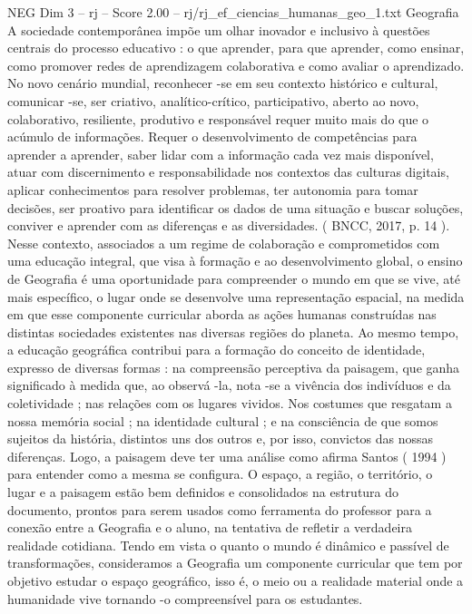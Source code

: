 \begin{textsample}{NEG Dim 3 – rj – Score 2.00 – rj/rj\_ef\_ciencias\_humanas\_geo\_1.txt}  \label{ex:f3_neg_278}
Geografia A sociedade contemporânea impõe um olhar inovador e inclusivo à questões centrais do processo educativo : o que aprender, para que aprender, como ensinar, como promover redes de aprendizagem colaborativa e como avaliar o aprendizado.
No novo cenário mundial, reconhecer -se em seu contexto histórico e cultural, comunicar -se, ser criativo, analítico-crítico, participativo, aberto ao novo, colaborativo, resiliente, produtivo e responsável requer muito mais do que o acúmulo de informações.
Requer o desenvolvimento de competências para aprender a aprender, saber lidar com a informação cada vez mais disponível, atuar com discernimento e responsabilidade nos contextos das culturas digitais, aplicar conhecimentos para resolver problemas, ter autonomia para tomar decisões, ser proativo para identificar os dados de uma situação e buscar soluções, conviver e aprender com as diferenças e as diversidades. ( BNCC, 2017, p. 14 ).
Nesse contexto, associados a um regime de colaboração e comprometidos com uma educação integral, que visa à formação e ao desenvolvimento global, o ensino de Geografia é uma oportunidade para compreender o mundo em que se vive, até mais específico, o lugar onde se desenvolve uma representação espacial, na medida em que esse componente curricular aborda as ações humanas construídas nas distintas sociedades existentes nas diversas regiões do planeta.
Ao mesmo tempo, a educação geográfica contribui para a formação do conceito de identidade, expresso de diversas formas : na compreensão perceptiva da paisagem, que ganha significado à medida que, ao observá -la, nota -se a vivência dos indivíduos e da coletividade ; nas relações com os lugares vividos.
Nos costumes que resgatam a nossa memória social ; na identidade cultural ; e na consciência de que somos sujeitos da história, distintos uns dos outros e, por isso, convictos das nossas diferenças.
Logo, a paisagem deve ter uma análise como afirma Santos ( 1994 ) para entender como a mesma se configura.
O espaço, a região, o território, o lugar e a paisagem estão bem definidos e consolidados na estrutura do documento, prontos para serem usados como ferramenta do professor para a conexão entre a Geografia e o aluno, na tentativa de refletir a verdadeira realidade cotidiana.
Tendo em vista o quanto o mundo é dinâmico e passível de transformações, consideramos a Geografia um componente curricular que tem por objetivo estudar o espaço geográfico, isso é, o meio ou a realidade material onde a humanidade vive tornando -o compreensível para os estudantes.

\end{textsample}

